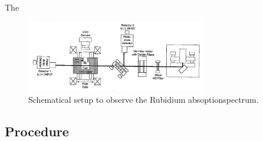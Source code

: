  The



\begin{figure}
  \centering
  \includegraphics[width=0.7\textwidth]{setup3.png}
  \caption{Schematical setup to observe the Rubidium absoptionspectrum.\cite{V61}}
  \label{fig:setup3}
\end{figure}



\subsection{Procedure}
\label{subsec:procedure}
